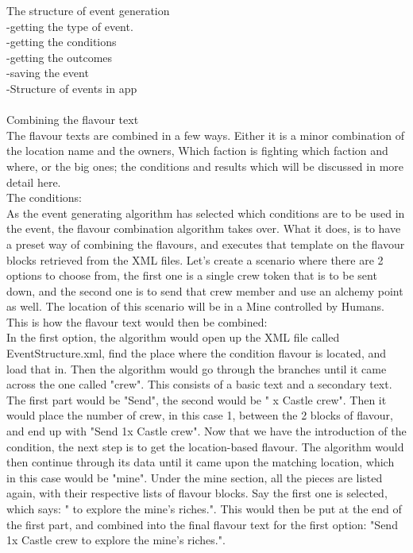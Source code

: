 The structure of event generation\\
-getting the type of event.\\
-getting the conditions\\
-getting the outcomes\\
-saving the event\\
-Structure of events in app\\\\

Combining the flavour text\\

The flavour texts are combined in a few ways. Either it is a minor combination of the location name and the owners, Which faction is fighting which faction and where, or the big ones; the conditions and results which will be discussed in more detail here.\\

The conditions:\\
As the event generating algorithm has selected which conditions are to be used in the event, the flavour combination algorithm takes over. What it does, is to have a preset way of combining the flavours, and executes that template on the flavour blocks retrieved from the XML files. Let's create a scenario where there are 2 options to choose from, the first one is a single crew  token that is to be sent down, and the second one is to send that crew member and use an alchemy point as well. The location of this scenario will be in a Mine controlled by Humans.
This is how the flavour text would then be combined:\\
In the first option, the algorithm would open up the XML file called EventStructure.xml, find the place where the condition flavour is located, and load that in. Then the algorithm would go through the branches until it came across the one called "crew". This consists of a basic text and a secondary text. The first part would be "Send", the second would be " x Castle crew". Then it would place the number of crew, in this case 1, between the 2 blocks of flavour, and end up with "Send 1x Castle crew".
Now that we have the introduction of the condition, the next step is to get the location-based flavour. The algorithm would then continue through its data until it came upon the matching location, which in this case would be "mine". Under the mine section, all the pieces are listed again, with their respective lists of flavour blocks. Say the first one is selected, which says: " to explore the mine's riches.". This would then be put at the end of the first part, and combined into the final flavour text for the first option: "Send 1x Castle crew to explore the mine's riches.".

